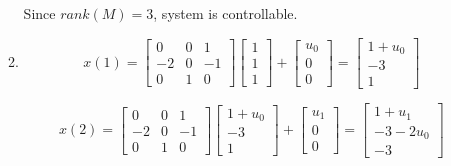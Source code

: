 \documentclass[12pt,a4paper, margin=1in]{article}
\begin{document}
\begin{enumerate}[label=\textbf{\arabic*.}]
\begin{enumerate}
                Since $rank(M) = 3$, system is controllable.
           \item 
                \begin{equation*}
                    x(1) = \begin{bmatrix}
                        0 & 0 & 1 \\
                        -2 & 0 & -1 \\
                        0 & 1 & 0
                    \end{bmatrix} \begin{bmatrix}
                        1 \\ 1 \\ 1
                    \end{bmatrix} + \begin{bmatrix}
                        u_0 \\ 0 \\ 0
                    \end{bmatrix} = \begin{bmatrix}
                        1 + u_0 \\ -3 \\ 1
                    \end{bmatrix}
                \end{equation*}

                \begin{equation*}
                    x(2) = \begin{bmatrix}
                        0 & 0 & 1 \\
                        -2 & 0 & -1 \\
                        0 & 1 & 0
                    \end{bmatrix} \begin{bmatrix}
                        1 + u_0 \\ -3 \\ 1
                    \end{bmatrix} + \begin{bmatrix}
                        u_1 \\ 0 \\ 0
                    \end{bmatrix} = \begin{bmatrix}
                        1 + u_1 \\ -3 -2u_0 \\ -3
                    \end{bmatrix}
                \end{equation*}


\end{enumerate}
\end{enumerate}
\end{document}

